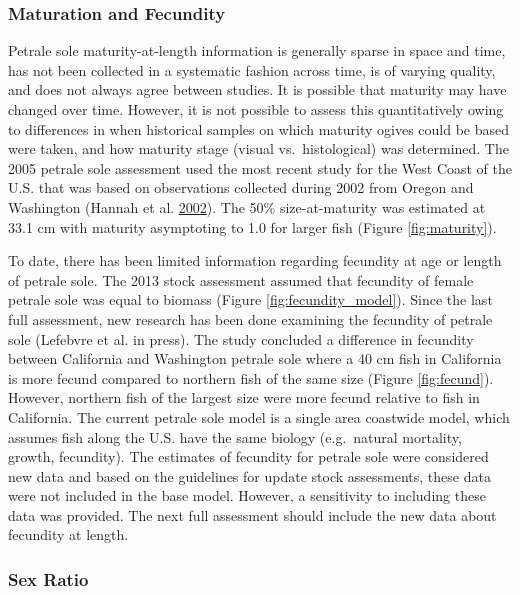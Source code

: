 \documentclass[12pt,]{article}
\begin{document}
\subsubsection{Maturation and Fecundity}\label{maturation-and-fecundity}

Petrale sole maturity-at-length information is generally sparse in space
and time, has not been collected in a systematic fashion across time, is
of varying quality, and does not always agree between studies. It is
possible that maturity may have changed over time. However, it is not
possible to assess this quantitatively owing to differences in when
historical samples on which maturity ogives could be based were taken,
and how maturity stage (visual vs.~histological) was determined. The
2005 petrale sole assessment used the most recent study for the West
Coast of the U.S. that was based on observations collected during 2002
from Oregon and Washington (Hannah et al.
\protect\hyperlink{ref-hannah_length_2002}{2002}). The 50\%
size-at-maturity was estimated at 33.1 cm with maturity asymptoting to
1.0 for larger fish (Figure \ref{fig:maturity}).

To date, there has been limited information regarding fecundity at age
or length of petrale sole. The 2013 stock assessment assumed that
fecundity of female petrale sole was equal to biomass (Figure
\ref{fig:fecundity_model}). Since the last full assessment, new research
has been done examining the fecundity of petrale sole (Lefebvre et al.
in press). The study concluded a difference in fecundity between
California and Washington petrale sole where a 40 cm fish in California
is more fecund compared to northern fish of the same size (Figure
\ref{fig:fecund}). However, northern fish of the largest size were more
fecund relative to fish in California. The current petrale sole model is
a single area coastwide model, which assumes fish along the U.S. have
the same biology (e.g.~natural mortality, growth, fecundity). The
estimates of fecundity for petrale sole were considered new data and
based on the guidelines for update stock assessments, these data were
not included in the base model. However, a sensitivity to including
these data was provided. The next full assessment should include the new
data about fecundity at length.

\subsubsection{Sex Ratio}\label{sex-ratio}
\end{document}
